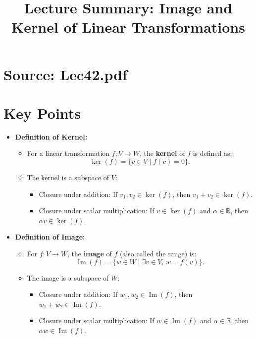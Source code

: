 \documentclass{article}
\title{Lecture Summary: Image and Kernel of Linear Transformations}
\author{}
\date{}
\begin{document}
\maketitle

\section*{Source: Lec42.pdf}

\section*{Key Points}

\begin{itemize}
  \item \textbf{Definition of Kernel:}
    \begin{itemize}
      \item For a linear transformation $f: V \to W$, the \textbf{kernel} of $f$ is defined as:
        \[
          \ker(f) = \{v \in V \mid f(v) = 0\}.
        \]
      \item The kernel is a subspace of $V$:
        \begin{itemize}
          \item Closure under addition: If $v_1, v_2 \in \ker(f)$, then $v_1 + v_2 \in \ker(f)$.
          \item Closure under scalar multiplication: If $v \in \ker(f)$ and $\alpha \in \mathbb{R}$, then $\alpha v \in \ker(f)$.
        \end{itemize}
    \end{itemize}

  \item \textbf{Definition of Image:}
    \begin{itemize}
      \item For $f: V \to W$, the \textbf{image} of $f$ (also called the range) is:
        \[
          \operatorname{Im}(f) = \{w \in W \mid \exists v \in V, \, w = f(v)\}.
        \]
      \item The image is a subspace of $W$:
        \begin{itemize}
          \item Closure under addition: If $w_1, w_2 \in \operatorname{Im}(f)$, then $w_1 + w_2 \in \operatorname{Im}(f)$.
          \item Closure under scalar multiplication: If $w \in \operatorname{Im}(f)$ and $\alpha \in \mathbb{R}$, then $\alpha w \in \operatorname{Im}(f)$.
        \end{itemize}
    \end{itemize}


\end{itemize}
\end{document}
